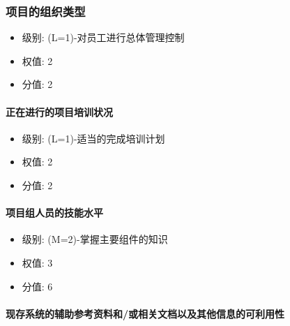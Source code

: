 \documentclass[hyperref, a4paper]{ctexart}
\providecommand{\tightlist}{%
  \setlength{\itemsep}{0pt}\setlength{\parskip}{0pt}}
\let\oldparagraph\paragraph
\renewcommand{\paragraph}[1]{\oldparagraph{#1}\mbox{}}
\begin{document}
\hypertarget{ux9879ux76eeux7684ux7ec4ux7ec7ux7c7bux578b}{%
\subsubsection{项目的组织类型}\label{ux9879ux76eeux7684ux7ec4ux7ec7ux7c7bux578b}}

\begin{itemize}
\tightlist
\item
  级别: (L=1)-对员工进行总体管理控制
\item
  权值: 2
\item
  分值: 2
\end{itemize}

\hypertarget{ux6b63ux5728ux8fdbux884cux7684ux9879ux76eeux57f9ux8badux72b6ux51b5}{%
\paragraph{正在进行的项目培训状况}\label{ux6b63ux5728ux8fdbux884cux7684ux9879ux76eeux57f9ux8badux72b6ux51b5}}

\begin{itemize}
\tightlist
\item
  级别: (L=1)-适当的完成培训计划
\item
  权值: 2
\item
  分值: 2
\end{itemize}

\hypertarget{ux9879ux76eeux7ec4ux4ebaux5458ux7684ux6280ux80fdux6c34ux5e73}{%
\paragraph{项目组人员的技能水平}\label{ux9879ux76eeux7ec4ux4ebaux5458ux7684ux6280ux80fdux6c34ux5e73}}

\begin{itemize}
\tightlist
\item
  级别: (M=2)-掌握主要组件的知识
\item
  权值: 3
\item
  分值: 6
\end{itemize}

\hypertarget{ux73b0ux5b58ux7cfbux7edfux7684ux8f85ux52a9ux53c2ux8003ux8d44ux6599ux548cux6216ux76f8ux5173ux6587ux6863ux4ee5ux53caux5176ux4ed6ux4fe1ux606fux7684ux53efux5229ux7528ux6027}{%
\paragraph{现存系统的辅助参考资料和/或相关文档以及其他信息的可利用性}\label{ux73b0ux5b58ux7cfbux7edfux7684ux8f85ux52a9ux53c2ux8003ux8d44ux6599ux548cux6216ux76f8ux5173ux6587ux6863ux4ee5ux53caux5176ux4ed6ux4fe1ux606fux7684ux53efux5229ux7528ux6027}}
\end{document}
